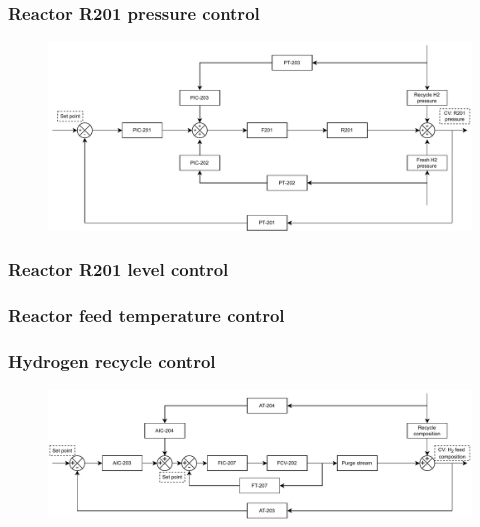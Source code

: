 \subsubsection{Reactor R201 pressure control}
\begin{figure}[H]
    \centering
    \includegraphics[width=\linewidth]{chapters/4-operation-control/4-Figures/R201-PC.pdf}
    \caption{}
    \label{fig:R201-PC}
\end{figure}

\subsubsection{Reactor R201 level control}

\subsubsection{Reactor feed temperature control}

\subsubsection{Hydrogen recycle control}
\begin{figure}[H]
    \centering
    \includegraphics[width=\linewidth]{chapters/4-operation-control/4-Figures/V202-CC.pdf}
    \caption{}
    \label{fig:V202-CC}
\end{figure}

